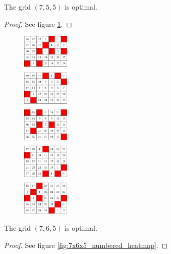 \begin{con}
\label{con:7x5x5}
The grid $(7,5,5)$ is optimal.
\end{con}

\begin{proof}
See figure \ref{fig:7x5x5_numbered_heatmap}.
\end{proof}

\begin{figure}[]
\centering
\includegraphics[width=0.2\textwidth]{figures/A/7x5x5_numbered_heatmap.pdf}
\caption{}
\label{fig:7x5x5_numbered_heatmap}
\end{figure}

\begin{con}
\label{con:7x6x5}
The grid $(7,6,5)$ is optimal.
\end{con}

\begin{proof}
See figure \ref{fig:7x6x5_numbered_heatmap}.
\end{proof}

